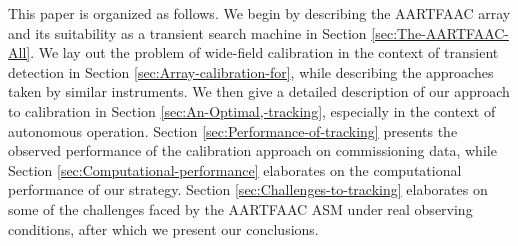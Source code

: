 \documentclass{aa}
\begin{document}
 This paper is organized as follows.   We begin by describing the AARTFAAC array
 and   its   suitability   as    a   transient   search   machine   in   Section
 \ref{sec:The-AARTFAAC-All}. We lay out the problem of wide-field calibration in
 the context of  transient detection in Section \ref{sec:Array-calibration-for},
 while describing the  approaches taken by similar instruments.   We then give a
 detailed   description  of  our   approach  to    calibration   in  Section
 \ref{sec:An-Optimal,-tracking},  especially   in  the  context   of  autonomous
 operation.   Section  \ref{sec:Performance-of-tracking}  presents the  observed
 performance of  the calibration approach  on commissioning data,  while Section
 \ref{sec:Computational-performance} elaborates on the computational performance
 of our  strategy.  Section \ref{sec:Challenges-to-tracking}  elaborates on some
 of the  challenges faced by the  AARTFAAC ASM under  real observing conditions,
 after which we present our conclusions.
\end{document}
